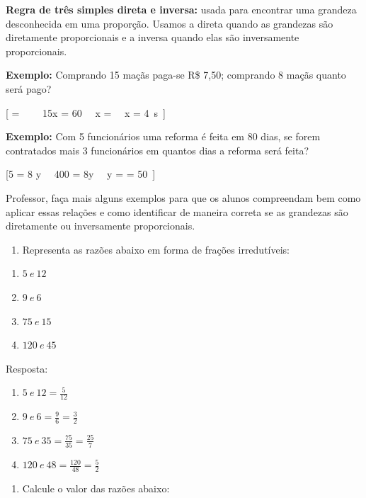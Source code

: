 \textbf{{Regra de três simples direta e inversa:}} usada para encontrar
uma grandeza desconhecida em uma proporção. Usamos a direta quando as
grandezas são diretamente proporcionais e a inversa quando elas são
inversamente proporcionais.

\textbf{Exemplo:} Comprando 15 maçãs paga-se R\$ 7,50; comprando 8 maçãs
quanto será pago?

[ = \ \  \rightarrow \ \ 15x = 60 \rightarrow \ \ x =  \rightarrow \ \ x = 4\ s\ ]

\textbf{Exemplo:} Com 5 funcionários uma reforma é feita em 80 dias, se
forem contratados mais 3 funcionários em quantos dias a reforma será
feita?

[5  = 8 \times y \rightarrow \ \ 400 = 8y \rightarrow \ \ y =  = 50\ ]

Professor, faça mais alguns exemplos para que os alunos compreendam bem
como aplicar essas relações e como identificar de maneira correta se as
grandezas são diretamente ou inversamente proporcionais.


\begin{enumerate}
\def\labelenumi{\arabic{enumi})}
\tightlist
\item
  Representa as razões abaixo em forma de frações irredutíveis:
\end{enumerate}

\begin{enumerate}
\def\labelenumi{\alph{enumi})}
\item
  \(5\ e\ 12\)
\item
  \(9\ e\ 6\)
\item
  \(75\ e\ 15\)
\item
  \(120\ e\ 45\)
\end{enumerate}

Resposta:

\begin{enumerate}
\def\labelenumi{\alph{enumi})}
\item
  \(5\ e\ 12 = \frac{5}{12}\)
\item
  \(9\ e\ 6 = \frac{9}{6} = \frac{3}{2}\)
\item
  \(75\ e\ 35 = \frac{75}{35} = \frac{25}{7}\)
\item
  \(120\ e\ 48 = \frac{120}{48} = \frac{5}{2}\ \)
\end{enumerate}

\begin{enumerate}
\def\labelenumi{\arabic{enumi})}
\setcounter{enumi}{1}
\tightlist
\item
  Calcule o valor das razões abaixo:
\end{enumerate}

